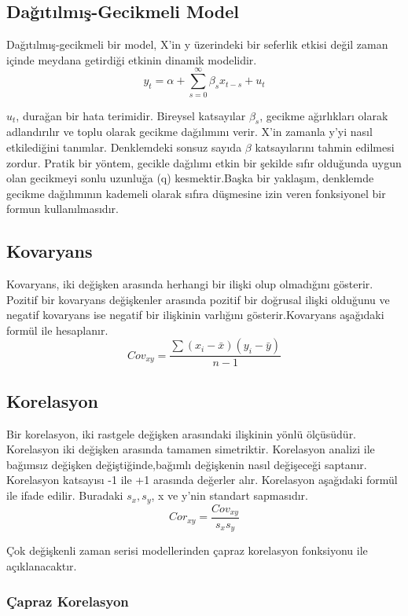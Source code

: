 \documentclass[11pt]{article}
\begin{document}
\subsection{Dağıtılmış-Gecikmeli
Model}\label{daux11fux131tux131lmux131ux15f-gecikmeli-model}

Dağıtılmış-gecikmeli bir model, X'in y üzerindeki bir seferlik etkisi
değil zaman içinde meydana getirdiği etkinin dinamik modelidir.
\[y_t=\alpha + \sum_{s=0}^{\infty}\beta_sx_{t-s}+u_t\]

\(u_t\), durağan bir hata terimidir. Bireysel katsayılar \(\beta_s\),
gecikme ağırlıkları olarak adlandırılır ve toplu olarak gecikme
dağılımını verir. X'in zamanla y'yi nasıl etkilediğini tanımlar.
Denklemdeki sonsuz sayıda \(\beta\) katsayılarını tahmin edilmesi
zordur. Pratik bir yöntem, gecikle dağılımı etkin bir şekilde sıfır
olduğunda uygun olan gecikmeyi sonlu uzunluğa (q) kesmektir.Başka bir
yaklaşım, denklemde gecikme dağılımının kademeli olarak sıfıra düşmesine
izin veren fonksiyonel bir formun kullanılmasıdır.

\subsection{Kovaryans}\label{kovaryans}

Kovaryans, iki değişken arasında herhangi bir ilişki olup olmadığını
gösterir. Pozitif bir kovaryans değişkenler arasında pozitif bir
doğrusal ilişki olduğunu ve negatif kovaryans ise negatif bir ilişkinin
varlığını gösterir.Kovaryans aşağıdaki formül ile hesaplanır.
\[ Cov_{xy} = \frac {\sum{(x_i-\bar{x})(y_i-\bar{y})}}{n-1} \]

\subsection{Korelasyon}\label{korelasyon}

Bir korelasyon, iki rastgele değişken arasındaki ilişkinin yönlü
ölçüsüdür. Korelasyon iki değişken arasında tamamen simetriktir.
Korelasyon analizi ile bağımsız değişken değiştiğinde,bağımlı değişkenin
nasıl değişeceği saptanır. Korelasyon katsayısı -1 ile +1 arasında
değerler alır. Korelasyon aşağıdaki formül ile ifade edilir. Buradaki
\(s_x,s_y\), x ve y'nin standart sapmasıdır.
\[ Cor_{xy} = \frac {Cov_{xy} }{s_x s_y} \]

Çok değişkenli zaman serisi modellerinden çapraz korelasyon fonksiyonu
ile açıklanacaktır.

\subsubsection{Çapraz Korelasyon}\label{uxe7apraz-korelasyon}
\end{document}
